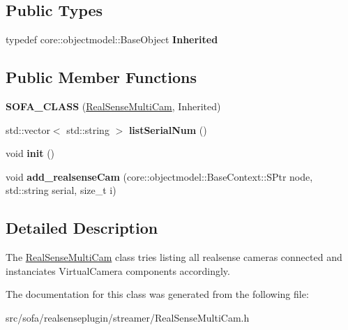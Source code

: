 \subsection*{Public Types}
\begin{DoxyCompactItemize}
\item 
\mbox{\label{classsofa_1_1rgbdtracking_1_1_real_sense_multi_cam_ac46918355916b1af92c7aabc7e244e39}} 
typedef core\+::objectmodel\+::\+Base\+Object {\bfseries Inherited}
\end{DoxyCompactItemize}
\subsection*{Public Member Functions}
\begin{DoxyCompactItemize}
\item 
\mbox{\label{classsofa_1_1rgbdtracking_1_1_real_sense_multi_cam_a580a759696c9de476a75c1aabc955669}} 
{\bfseries S\+O\+F\+A\+\_\+\+C\+L\+A\+SS} (\hyperlink{classsofa_1_1rgbdtracking_1_1_real_sense_multi_cam}{Real\+Sense\+Multi\+Cam}, Inherited)
\item 
\mbox{\label{classsofa_1_1rgbdtracking_1_1_real_sense_multi_cam_ae06084e54a01de953a441b1994ad22e7}} 
std\+::vector$<$ std\+::string $>$ {\bfseries list\+Serial\+Num} ()
\item 
\mbox{\label{classsofa_1_1rgbdtracking_1_1_real_sense_multi_cam_ac93ba93ba4d82475f37e4300173b168d}} 
void {\bfseries init} ()
\item 
\mbox{\label{classsofa_1_1rgbdtracking_1_1_real_sense_multi_cam_a1aea376ebf5a7ee03af4cae251380e89}} 
void {\bfseries add\+\_\+realsense\+Cam} (core\+::objectmodel\+::\+Base\+Context\+::\+S\+Ptr node, std\+::string serial, size\+\_\+t i)
\end{DoxyCompactItemize}


\subsection{Detailed Description}
The \hyperlink{classsofa_1_1rgbdtracking_1_1_real_sense_multi_cam}{Real\+Sense\+Multi\+Cam} class tries listing all realsense cameras connected and instanciates Virtual\+Camera components accordingly. 

The documentation for this class was generated from the following file\+:\begin{DoxyCompactItemize}
\item 
src/sofa/realsenseplugin/streamer/Real\+Sense\+Multi\+Cam.\+h\end{DoxyCompactItemize}
